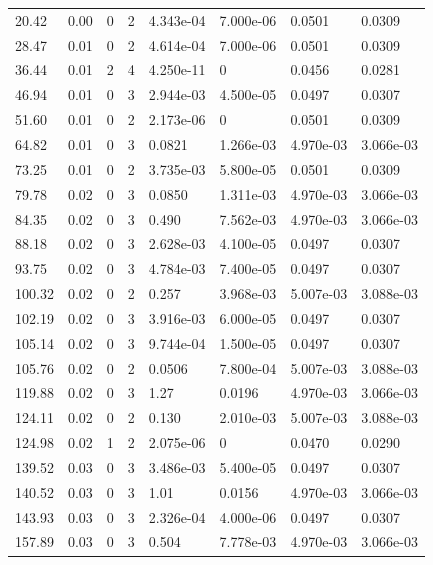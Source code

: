 \documentclass[preview]{standalone}
\begin{document}
{{\begin{tabular}{L{1.2cm}C{1.2cm} C{0.3cm}C{0.5cm} C{1.4cm}C{1.4cm} C{1.4cm}C{1.4cm}}
  20.42  &  0.00  & 0     &  2 &  4.343e-04  & 7.000e-06  & 0.0501 &  0.0309   \\ 
  28.47  &  0.01  & 0     &  2 &  4.614e-04  & 7.000e-06  & 0.0501 &  0.0309   \\ 
  36.44  &  0.01  & 2     &  4 &  4.250e-11  & 0  & 0.0456 &  0.0281   \\ 
  46.94  &  0.01  & 0     &  3 &  2.944e-03  & 4.500e-05  & 0.0497 &  0.0307   \\ 
  51.60  &  0.01  & 0     &  2 &  2.173e-06  & 0  & 0.0501 &  0.0309   \\ 
  64.82  &  0.01  & 0     &  3 &  0.0821  & 1.266e-03  & 4.970e-03 &  3.066e-03   \\ 
  73.25  &  0.01  & 0     &  2 &  3.735e-03  & 5.800e-05  & 0.0501 &  0.0309   \\ 
  79.78  &  0.02  & 0     &  3 &  0.0850  & 1.311e-03  & 4.970e-03 &  3.066e-03   \\ 
  84.35  &  0.02  & 0     &  3 &  0.490  & 7.562e-03  & 4.970e-03 &  3.066e-03   \\ 
  88.18  &  0.02  & 0     &  3 &  2.628e-03  & 4.100e-05  & 0.0497 &  0.0307   \\ 
  93.75  &  0.02  & 0     &  3 &  4.784e-03  & 7.400e-05  & 0.0497 &  0.0307   \\ 
  100.32  &  0.02  & 0     &  2 &  0.257  & 3.968e-03  & 5.007e-03 &  3.088e-03   \\ 
  102.19  &  0.02  & 0     &  3 &  3.916e-03  & 6.000e-05  & 0.0497 &  0.0307   \\ 
  105.14  &  0.02  & 0     &  3 &  9.744e-04  & 1.500e-05  & 0.0497 &  0.0307   \\ 
  105.76  &  0.02  & 0     &  2 &  0.0506  & 7.800e-04  & 5.007e-03 &  3.088e-03   \\ 
  119.88  &  0.02  & 0     &  3 &  1.27  & 0.0196  & 4.970e-03 &  3.066e-03   \\ 
  124.11  &  0.02  & 0     &  2 &  0.130  & 2.010e-03  & 5.007e-03 &  3.088e-03   \\ 
  124.98  &  0.02  & 1     &  2 &  2.075e-06  & 0  & 0.0470 &  0.0290   \\ 
  139.52  &  0.03  & 0     &  3 &  3.486e-03  & 5.400e-05  & 0.0497 &  0.0307   \\ 
  140.52  &  0.03  & 0     &  3 &  1.01  & 0.0156  & 4.970e-03 &  3.066e-03   \\ 
  143.93  &  0.03  & 0     &  3 &  2.326e-04  & 4.000e-06  & 0.0497 &  0.0307   \\ 
  157.89  &  0.03  & 0     &  3 &  0.504  & 7.778e-03  & 4.970e-03 &  3.066e-03   \\ 

\end{tabular}}}
\end{document}
